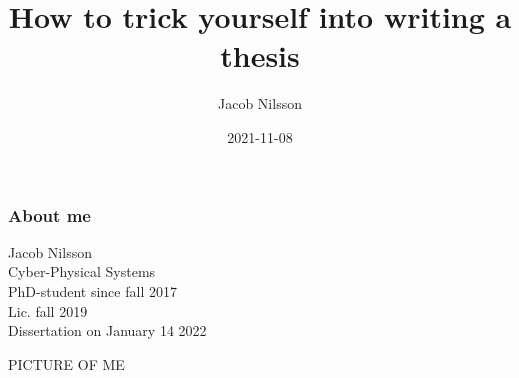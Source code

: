 \documentclass[aspectratio=1610]{beamer}
\title{How to trick yourself into writing a thesis}
\date{2021-11-08}
\author{Jacob Nilsson}
\begin{document}
	\maketitle

	\begin{frame}[t]
		\frametitle{About me}
		\vfill
		\begin{minipage}[c][][c]{0.49\textwidth}
			Jacob Nilsson\\
			Cyber-Physical Systems\\
			PhD-student since fall 2017\\
			\alert<2>{Lic. fall 2019}\\
			\alert<3>{Dissertation on January 14 2022}\\
		\end{minipage}
		\hfill
		\begin{minipage}[c][][c]{0.49\textwidth}
			\centering
			PICTURE OF ME
		\end{minipage}
	\end{frame}
\end{document}
